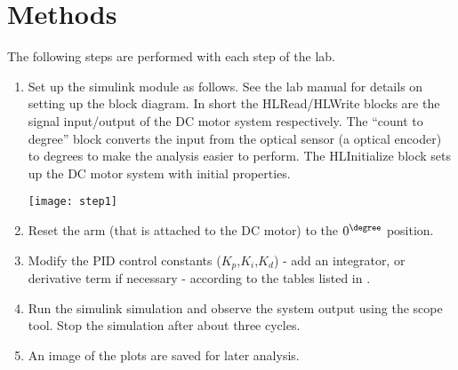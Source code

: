 \documentclass[main.tex]{subfile}
\begin{document}
\section{Methods} 
\label{sec:methods}

The following steps are performed with each step of the lab.

\begin{enumerate}
	\item 
		Set up the simulink module as follows. See the lab manual for details on
		setting up the block diagram. In short the HLRead/HLWrite blocks are the
		signal input/output of the DC motor system respectively. The ``count to
		degree'' block converts the input from the optical sensor (a optical
		encoder) to degrees to make the analysis easier to perform. The HLInitialize
		block sets up the DC motor system with initial properties.

		\begin{center}
			\texttt{[image: step1]}
		\end{center}

	\item
		Reset the arm (that is attached to the DC motor) to the $0^{\degree}$
		position.

	\item
		Modify the PID control constants ($K_p$,$K_i$,$K_d$) - add an integrator, or
		derivative term if necessary - according to the tables listed in
		.

	\item
		Run the simulink simulation and observe the system output using the scope
		tool. Stop the simulation after about three cycles.

	\item
		An image of the plots are saved for later analysis.

\end{enumerate}

\end{document}
